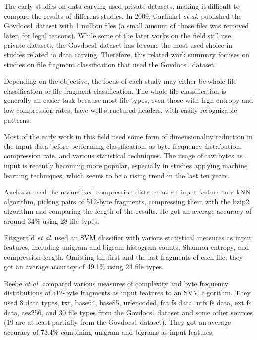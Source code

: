 The early studies on data carving used private datasets, making it difficult to compare the results of different studies. In 2009, Garfinkel \textit{et al.} \cite{garfinkel_bringing_2009} published the Govdocs1 dataset with 1 million files (a small amount of those files was removed later, for legal reasons). While some of the later works on the field still use private datasets, the Govdocs1 dataset has become the most used choice in studies related to data carving.
Therefore, this related work summary focuses on studies on file fragment classification that used the Govdocs1 dataset.

Depending on the objective, the focus of each study may either be whole file classification or file fragment classification. The whole file classification is generally an easier task because most file types, even those with high entropy and low compression rates, have well-structured headers, with easily recognizable patterns.

Most of the early work in this field used some form of dimensionality reduction in the input data before performing classification, as byte frequency distribution, compression rate, and various statistical techniques. The usage of raw bytes as input is recently becoming more popular, especially in studies applying machine learning techniques, which seems to be a rising trend in the last ten years.

Axelsson \cite{axelsson_normalised_2010} used the normalized compression distance as an input feature to a kNN algorithm, picking pairs of 512-byte fragments, compressing them with the bzip2 algorithm and comparing the length of the results.
He got an average accuracy of around 34\% using 28 file types.

Fitzgerald \textit{et al.} \cite{fitzgerald_using_2012}  used an SVM classifier with various statistical measures as input features, including unigram and bigram histogram counts, Shannon entropy, and compression length.
Omitting the first and the last fragments of each file, they got an average accuracy of 49.1\% using 24 file types.

Beebe \textit{et al.} \cite{beebe_sceadan:_2013}
compared various measures of complexity and byte frequency distributions of 512-byte fragments as input features to an SVM algorithm. They used 8 data types, txt, base64, base85, urlencoded, fat fs data, ntfs fs data, ext fs data, aes256, and
30 file types
from the Govdocs1 dataset and some other sources (19 are at least partially from the Govdocs1 dataset). They got an average accuracy of 73.4\% combining unigram and bigrams as input features.

